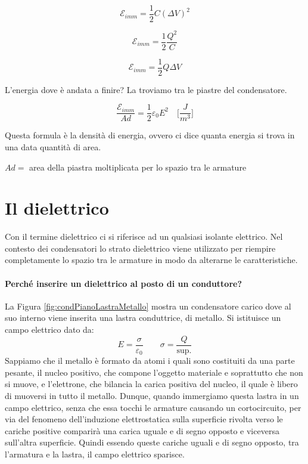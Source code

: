 \begin{equation*}
    \mathcal{E}_{imm} = \frac{1}{2}C(\Delta V)^2
\end{equation*}

\begin{equation*}
    \mathcal{E}_{imm} = \frac{1}{2}\frac{Q^2}{C}
\end{equation*}

\begin{equation}
    \mathcal{E}_{imm} = \frac{1}{2}Q\Delta V
\end{equation}

L'energia dove è andata a finire? La troviamo tra le piastre del condensatore.

\begin{equation*}
    \frac{\mathcal{E}_{imm}}{Ad} = \frac{1}{2}\varepsilon_0 E^2\quad\bigg[\frac{J}{m^3}\bigg]
\end{equation*}

Questa formula è la densità di energia, ovvero ci dice quanta energia si trova in una data quantità di area. 

$Ad =$ area della piastra moltiplicata per lo spazio tra le armature

\newpage
\section{Il dielettrico}
Con il termine dielettrico ci si riferisce ad un qualsiasi isolante elettrico. Nel contesto dei condensatori lo strato dielettrico viene utilizzato per riempire completamente lo spazio tra le armature in modo da alterarne le caratteristiche.

\paragraph{Perché inserire un dielettrico al posto di un conduttore?}
La Figura \ref{fig:condPianoLastraMetallo} mostra un condensatore carico dove al suo interno viene inserita una lastra conduttrice, di metallo.
Si istituisce un campo elettrico dato da:
\begin{equation*}
    E = \frac{\sigma}{\varepsilon_0}\qquad\sigma = \frac{Q}{\text{sup.}}
\end{equation*}
Sappiamo che il metallo è formato da atomi i quali sono costituiti da una parte pesante, il nucleo positivo, che compone l'oggetto materiale e soprattutto che non si muove, e l'elettrone, che bilancia la carica positiva del nucleo, il quale è libero di muoversi in tutto il metallo.
Dunque, quando immergiamo questa lastra in un campo elettrico, senza che essa tocchi le armature causando un cortocircuito, per via del fenomeno dell'induzione elettrostatica sulla superficie rivolta verso le cariche positive comparirà una carica uguale e di segno opposto e viceversa sull'altra superficie.
Quindi essendo queste cariche uguali e di segno opposto, tra l'armatura e la lastra, il campo elettrico sparisce.

